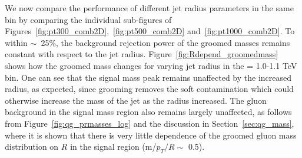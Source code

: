 We now compare the performance of different jet radius parameters in the same \pT bin by comparing the individual sub-figures
 of Figures~\ref{fig:pt300_comb2D},~\ref{fig:pt500_comb2D}
and~\ref{fig:pt1000_comb2D}. To within
$\sim$~25\%, the background rejection power of the groomed masses remains
constant with respect to the jet
radius. Figure~\ref{fig:Rdepend_groomedmass} shows how the groomed
mass changes for varying jet radius in the \pT = 1.0-1.1 TeV bin. One
can see that the signal mass peak remains unaffected by the increased
radius, as expected, since grooming removes the soft contamination
which could otherwise increase the mass of the jet as the radius
increased. The gluon background in the signal mass region also remains
largely unaffected, as follows from Figure~\ref{fig:qg_prmasses_log}
and the discussion in Section~\ref{sec:qg_mass},
where it is shown that there is very little dependence of the groomed gluon mass
distribution on $R$ in the signal region (m/$p_{T}/R \sim$ 0.5). 

